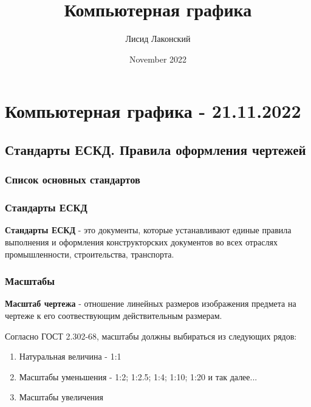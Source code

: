 \documentclass{article}
\title{Компьютерная графика}
\author{Лисид Лаконский}
\date{November 2022}
\begin{document}
\maketitle
\tableofcontents
\pagebreak

\section{Компьютерная графика - 21.11.2022}

\subsection{Стандарты ЕСКД. Правила оформления чертежей}

\subsubsection{Список основных стандартов}

\begin{flushleft}

\begin{multienumerate}
\end{multienumerate}

\subsubsection{Стандарты ЕСКД}

\textbf{Стандарты ЕСКД} - это документы, которые устанавливают единые правила выполнения и оформления конструкторских документов во всех отраслях промышленности, строительства, транспорта.

\subsubsection{Масштабы}

\textbf{Масштаб чертежа} - отношение линейных размеров изображения предмета на чертеже к его соотвествующим действительным размерам.

Согласно ГОСТ 2.302-68, масштабы должны выбираться из следующих рядов:

\begin{enumerate}
    \item Натуральная величина - 1:1
    \item Масштабы уменьшения - 1:2; 1:2.5; 1:4; 1:10; 1:20 и так далее...
    \item Масштабы увеличения
\end{enumerate}

\end{flushleft}
\end{document}
